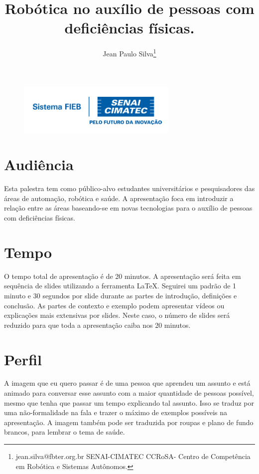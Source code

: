 \documentclass[12pt,a4paper]{article}
\begin{document}
 
\begin{figure}
    \flushright
    \includegraphics[scale=0.5]{Logo_senai.png}
\end{figure}

\title{Robótica no auxílio de pessoas com deficiências físicas.}
\author{Jean Paulo Silva\thanks{jean.silva@fbter.org.br SENAI-CIMATEC  CCRoSA- Centro de Competência em Robótica e Sistemas Autônomos.}}
 
 

    \maketitle
    \singlespacing


    \section{Audiência}

    Esta palestra tem como público-alvo estudantes universitários e pesquisadores das áreas de automação, robótica e saúde. A apresentação foca em introduzir a relação entre as áreas baseando-se em novas tecnologias para o auxílio de pessoas com deficiências físicas.

    \section{Tempo}
    O tempo total de apresentação é de 20 minutos. A apresentação será feita em sequência de slides utilizando a ferramenta LaTeX. Seguirei um padrão de 1 minuto e 30 segundos por slide durante as partes de introdução, definições e conclusão. As partes de contexto e exemplo podem apresentar vídeos ou explicações mais extensivas por slides. Neste caso, o número de slides será reduzido para que toda a apresentação caiba nos 20 minutos.

    \section{Perfil}
    A imagem que eu quero passar é de uma pessoa que aprendeu um assunto e está animado para conversar esse assunto com a maior quantidade de pessoas possível, mesmo que tenha que passar um tempo explicando tal assunto. Isso se traduz por uma não-formalidade na fala e trazer o máximo de exemplos possíveis na apresentação. A imagem também pode ser traduzida por roupas e plano de fundo brancos, para lembrar o tema de saúde.
\end{document}
